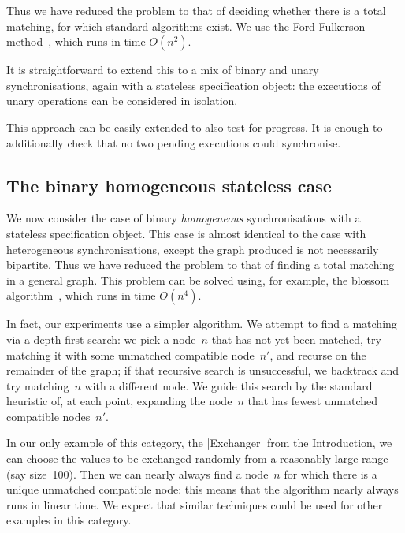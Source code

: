 Thus we have reduced the problem to that of deciding whether there is a total
matching, for which standard algorithms exist.  We use the Ford-Fulkerson
method~\cite{ford-fulkerson}, which runs in time $O(n^2)$.

It is straightforward to extend this to a mix of binary and unary
synchronisations, again with a stateless specification object: the executions
of unary operations can be considered in isolation.  

This approach can be easily extended to also test for progress.  It is enough
to additionally check that no two pending executions could synchronise.


\subsection{The binary homogeneous stateless case}
\label{sec:binary-homogeneous} 

We now consider the case of binary \emph{homogeneous} synchronisations with a
stateless specification object.  This case is almost identical to the case
with heterogeneous synchronisations, except the graph produced is not
necessarily bipartite.  Thus we have reduced the problem to that of finding a
total matching in a general graph.  This problem can be solved using, for
example, the blossom algorithm~\cite{edmonds_1965}, which runs in time
$O(n^4)$.
  


In fact, our experiments use a simpler algorithm.  We attempt to find a
matching via a depth-first search: we pick a node~$n$ that has not yet been
matched, try matching it with some unmatched compatible node~$n'$, and recurse
on the remainder of the graph; if that recursive search is unsuccessful, we
backtrack and try matching~$n$ with a different node.  We guide this search by
the standard heuristic of, at each point, expanding the node~$n$ that has
fewest unmatched compatible nodes~$n'$.  

In our only example of this category, the |Exchanger| from the Introduction,
we can choose the values to be exchanged randomly from a reasonably large
range (say size~100).  Then we can nearly always find a node~$n$ for which
there is a unique unmatched compatible node: this means that the algorithm
nearly always runs in linear time.  We expect that similar techniques could be
used for other examples in this category.

